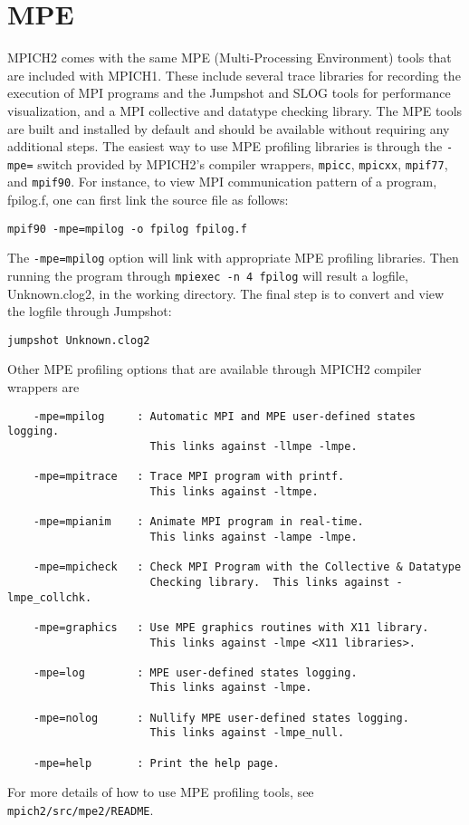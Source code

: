 \documentclass[dvipdfm,11pt]{article}
\begin{document}
\section{MPE}
\label{sec:mpe}
MPICH2 comes with the same MPE (Multi-Processing Environment) tools that are
included with MPICH1.  These include several trace libraries for recording the
execution of MPI programs and the Jumpshot and SLOG tools for performance
visualization, and a MPI collective and datatype checking library.
The MPE tools are built and installed by default and should be available
without requiring any additional steps.  The easiest way to use MPE profiling
libraries is through the \texttt{-mpe=} switch provided by MPICH2's
compiler wrappers,
\texttt{mpicc}, \texttt{mpicxx}, \texttt{mpif77}, and \texttt{mpif90}.
For instance, to view MPI communication pattern of a program, fpilog.f,
one can first link the source file as follows:
\begin{verbatim}
mpif90 -mpe=mpilog -o fpilog fpilog.f
\end{verbatim}
The \texttt{-mpe=mpilog} option will link with appropriate MPE profiling
libraries.  Then running the program through \texttt{mpiexec -n 4 fpilog}
will result a logfile, Unknown.clog2, in the working directory.
The final step is to convert and view the logfile through Jumpshot:
\begin{verbatim}
jumpshot Unknown.clog2
\end{verbatim}
Other MPE profiling options that are available through MPICH2 compiler wrappers
are 
\begin{verbatim}
    -mpe=mpilog     : Automatic MPI and MPE user-defined states logging.
                      This links against -llmpe -lmpe.

    -mpe=mpitrace   : Trace MPI program with printf.
                      This links against -ltmpe.

    -mpe=mpianim    : Animate MPI program in real-time.
                      This links against -lampe -lmpe.

    -mpe=mpicheck   : Check MPI Program with the Collective & Datatype
                      Checking library.  This links against -lmpe_collchk.

    -mpe=graphics   : Use MPE graphics routines with X11 library.
                      This links against -lmpe <X11 libraries>.

    -mpe=log        : MPE user-defined states logging.
                      This links against -lmpe.

    -mpe=nolog      : Nullify MPE user-defined states logging.
                      This links against -lmpe_null.

    -mpe=help       : Print the help page.
\end{verbatim}
For more details of how to use MPE profiling tools, see
\texttt{mpich2/src/mpe2/README}.
\end{document}
